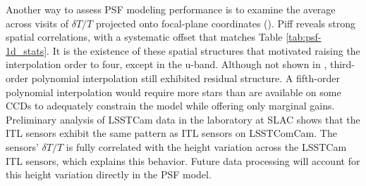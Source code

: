 Another way to assess \gls{PSF} modeling performance is to examine the average across visits of $\delta T/T$ projected onto focal-plane coordinates ().
Piff reveals strong spatial correlations, with a systematic offset
that matches Table \ref{tab:psf-1d_stats}. It is the existence of these spatial structures that motivated raising the interpolation order to four, except in the u-band.
Although not shown in , third-order polynomial interpolation still exhibited residual structure.
A fifth-order polynomial interpolation would require more stars than are available on some CCDs to adequately constrain the model while offering only marginal gains.
Preliminary analysis of LSSTCam data in the laboratory at \gls{SLAC} shows that the \gls{ITL} sensors exhibit the same pattern as \gls{ITL} sensors on \gls{LSSTComCam}.
The sensors' $\delta T/T$ is fully correlated with the height variation across the LSSTCam \gls{ITL} sensors, which explains this behavior.
Future data processing will account for this height variation directly in the \gls{PSF} model.
